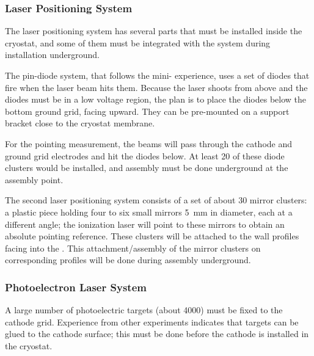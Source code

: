 \subsubsection{Laser Positioning System}
The laser positioning system has several parts that must be installed inside the 
cryostat,
and some of them must be integrated with the 
 system during installation underground. 

The pin-diode  system, that follows the mini- experience, uses a set of diodes that fire when the laser beam hits them. Because the laser shoots from above and the diodes must be in a low voltage region, the plan is to place the diodes below the bottom ground grid, facing upward. They can be pre-mounted on a support bracket close to the cryostat membrane. 

For the pointing measurement, the beams will pass through the cathode and ground grid electrodes and hit the diodes below. At least \num{20} of these diode clusters would be installed, and assembly must be done underground at the  assembly point.


The second laser positioning system consists of a set of about \num{30} mirror clusters: a plastic piece holding four to six small mirrors \SI{5}{\mm} in diameter, each at a different angle; the ionization laser will point to these mirrors to obtain an absolute pointing reference. These clusters will be attached to the wall  profiles facing into the . 
This attachment/assembly of the mirror clusters on corresponding  profiles will be done during  assembly underground.

\subsubsection{Photoelectron Laser System} 
A large number of photoelectric targets (about \num{4000}) must be fixed to the cathode grid. Experience from other experiments indicates that targets can be glued to the cathode surface; this
must be done before the cathode is installed in the cryostat. 


